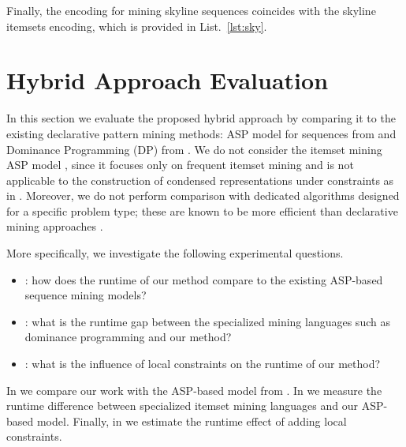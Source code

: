 \normalsize{Finally, %
the encoding for mining skyline sequences coincides with the skyline itemsets encoding, which is provided in List.~\ref{lst:sky}. 

\section{Hybrid Approach Evaluation}
In this section we evaluate the proposed hybrid approach by comparing it to the existing declarative pattern mining methods: ASP model for sequences from \parencite{DBLP:conf/ijcai/GebserGQ0S16} and Dominance Programming (DP) from \parencite{dp2013}. We do not consider the itemset mining ASP model \parencite{DBLP:conf/lpnmr/Jarvisalo11},  
since %
it focuses only on frequent itemset mining and is not applicable to the 
construction of condensed representations under constraints as in \parencite{dp2013}. Moreover, we do not perform comparison with dedicated algorithms designed for a specific problem type; these are known to be more efficient than declarative mining approaches \parencite{DBLP:conf/cpaior/NegrevergneG15}. 

More specifically, we investigate the following experimental questions. %

\begin{itemize}
  \item \qone: how does the runtime of our method compare to the existing ASP-based sequence mining models?
  \item \qtwo: what is the runtime gap between the specialized mining languages such as dominance programming and our method?
  \item \qthree: what is the influence of local constraints on the %
runtime of %
our method? 
\end{itemize}

In \qone we compare our work with the ASP-based model from  
\parencite{DBLP:conf/ijcai/GebserGQ0S16}. In \qtwo we measure 
the runtime difference between specialized itemset mining languages \parencite{dp2013}
and our ASP-based model.  Finally, in \qthree we estimate the runtime effect of adding local constraints.  

}
